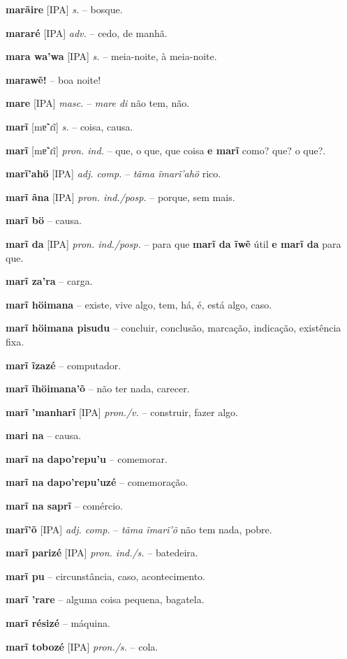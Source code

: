 \textbf{marãire} [IPA] \textit{s.} -- bosque.

\textbf{mararé} [IPA] \textit{adv.} -- cedo, de manhã.

\textbf{mara wa'wa} [IPA] \textit{s.} -- meia-noite, à meia-noite.

\textbf{marawẽ!} -- boa noite!

\textbf{mare} [IPA] \textit{masc.} -- \textit{mare di} não tem, não.

\textbf{marĩ} [mɐ̃ˈɾĩ] \textit{s.} -- coisa, causa.

\textbf{marĩ} [mɐ̃ˈɾĩ] \textit{pron. ind.} -- que, o que, que coisa  \textbf{e marĩ} como? que? o que?.

\textbf{marĩ'ahö} [IPA] \textit{adj. comp.} -- \textit{tãma ĩmarĩ'ahö} rico.

\textbf{marĩ ãna} [IPA] \textit{pron. ind./posp.} -- porque, sem mais.

\textbf{marĩ bö} -- causa.

\textbf{marĩ da} [IPA] \textit{pron. ind./posp.} -- para que  \textbf{marĩ da ĩwẽ} útil  \textbf{e marĩ da} para que.

\textbf{marĩ za'ra} -- carga.

\textbf{marĩ höimana} -- existe, vive algo, tem, há, é, está algo, caso.

\textbf{marĩ höimana pisudu} -- concluir, conclusão, marcação, indicação, existência fixa.

\textbf{marĩ ĩzazé} -- computador.

\textbf{marĩ ĩhöimana'õ} -- não ter nada, carecer.

\textbf{marĩ 'manharĩ} [IPA] \textit{pron./v.} -- construir, fazer algo.

\textbf{mari na} -- causa.

\textbf{marĩ na dapo'repu'u} -- comemorar.

\textbf{marĩ na dapo'repu'uzé} -- comemoração.

\textbf{marĩ na saprĩ} -- comércio.

\textbf{marĩ'õ} [IPA] \textit{adj. comp.} -- \textit{tãma ĩmarĩ'õ} não tem nada, pobre.

\textbf{marĩ parizé} [IPA] \textit{pron. ind./s.} -- batedeira.

\textbf{marĩ pu} -- circunstância, caso, acontecimento.

\textbf{marĩ 'rare} -- alguma coisa pequena, bagatela.

\textbf{marĩ résizé} -- máquina.

\textbf{marĩ tobozé} [IPA] \textit{pron./s.} -- cola.

